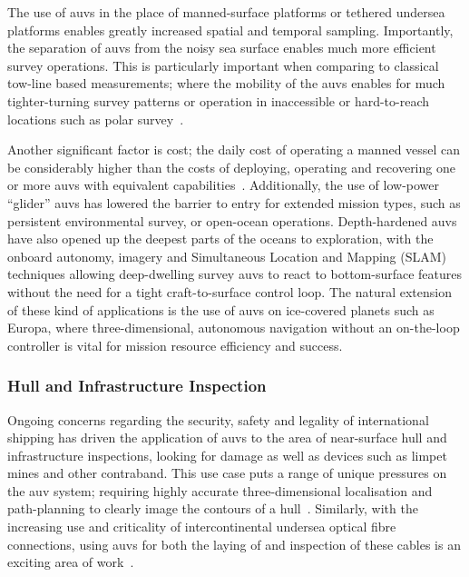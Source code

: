 The use of \glspl{auv} in the place of manned-surface platforms or tethered undersea platforms enables greatly increased spatial and temporal sampling.
Importantly, the separation of \glspl{auv} from the noisy sea surface enables much more efficient survey operations.
This is particularly important when comparing to classical tow-line based measurements; where the mobility of the \glspl{auv} enables for much tighter-turning survey patterns or operation in inaccessible or hard-to-reach locations such as polar survey~\cite{Curtin1993}.

Another significant factor is cost; the daily cost of operating a manned vessel can be considerably higher than the costs of deploying, operating and recovering one or more \glspl{auv} with equivalent capabilities~\cite{Nicholson2008}.
Additionally, the use of low-power ``glider'' \glspl{auv} has lowered the barrier to entry for extended mission types, such as persistent environmental survey, or open-ocean operations. 
Depth-hardened \glspl{auv} have also opened up the deepest parts of the oceans to exploration, with the onboard autonomy, imagery and Simultaneous Location and Mapping (SLAM) techniques allowing deep-dwelling survey \glspl{auv} to react to bottom-surface features without the need for a tight craft-to-surface control loop.
The natural extension of these kind of applications is the use of \glspl{auv} on ice-covered planets such as Europa, where three-dimensional, autonomous navigation without an on-the-loop controller is vital for mission resource efficiency and success.

\subsubsection{Hull and Infrastructure Inspection}
Ongoing concerns regarding the security, safety and legality of international shipping has driven the application of \glspl{auv} to the area of near-surface hull and infrastructure inspections, looking for damage as well as devices such as limpet mines and other contraband.
This use case puts a range of unique pressures on the \gls{auv} system; requiring highly accurate three-dimensional localisation and path-planning to clearly image the contours of a hull~\cite{Nicholson2008}.
Similarly, with the increasing use and criticality of intercontinental undersea optical fibre connections, using \glspl{auv} for both the laying of and inspection of these cables is an exciting area of work~\cite{Yu2004,Asakawa2002}.

